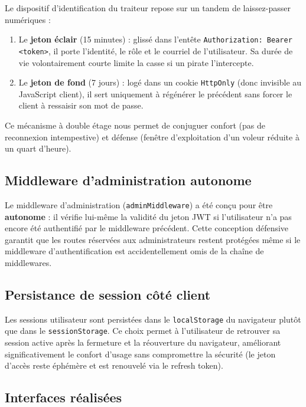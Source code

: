 Le dispositif d'identification du traiteur repose sur un tandem de laissez-passer numériques :

\begin{enumerate}
    \item Le \textbf{jeton éclair} (15 minutes) : glissé dans l'entête \texttt{Authorization: Bearer <token>}, il porte l'identité, le rôle et le courriel de l'utilisateur. Sa durée de vie volontairement courte limite la casse si un pirate l'intercepte.

    \item Le \textbf{jeton de fond} (7 jours) : logé dans un cookie \texttt{HttpOnly} (donc invisible au JavaScript client), il sert uniquement à régénérer le précédent sans forcer le client à ressaisir son mot de passe.
\end{enumerate}

Ce mécanisme à double étage nous permet de conjuguer confort (pas de reconnexion intempestive) et défense (fenêtre d'exploitation d'un voleur réduite à un quart d'heure).

\subsection{Middleware d'administration autonome}

Le middleware d'administration (\texttt{adminMiddleware}) a été conçu pour être \textbf{autonome} : il vérifie lui-même la validité du jeton JWT si l'utilisateur n'a pas encore été authentifié par le middleware précédent. Cette conception défensive garantit que les routes réservées aux administrateurs restent protégées même si le middleware d'authentification est accidentellement omis de la chaîne de middlewares.

\subsection{Persistance de session côté client}

Les sessions utilisateur sont persistées dans le \texttt{localStorage} du navigateur plutôt que dans le \texttt{sessionStorage}. Ce choix permet à l'utilisateur de retrouver sa session active après la fermeture et la réouverture du navigateur, améliorant significativement le confort d'usage sans compromettre la sécurité (le jeton d'accès reste éphémère et est renouvelé via le refresh token).

\subsection{Interfaces réalisées}


